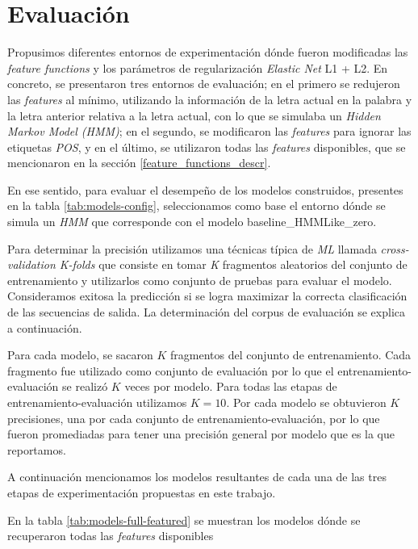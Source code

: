 \documentclass[letterpaper,12pt,oneside]{book}
\theoremstyle{definition}
\begin{document}
\section{Evaluación}

Propusimos diferentes entornos de experimentación dónde fueron modificadas las \textit{feature functions} y los parámetros de regularización \textit{Elastic Net} L1 + L2. En concreto, se presentaron tres entornos de evaluación; en el primero se redujeron las \textit{features} al mínimo, utilizando la información de la letra actual en la palabra y la letra anterior relativa a la letra actual, con lo que se simulaba un \textit{Hidden Markov Model (HMM)}; en el segundo, se modificaron las \textit{features} para ignorar las etiquetas \textit{POS}, y en el último, se utilizaron todas las \textit{features} disponibles, que se mencionaron en la sección \ref{feature_functions_descr}.

En ese sentido, para evaluar el desempeño de los modelos construidos, presentes en la tabla \ref{tab:models-config}, seleccionamos como base el entorno dónde se simula un \textit{HMM} que corresponde con el modelo \textsf{baseline\_HMMLike\_zero}. 

Para determinar la precisión utilizamos una técnicas típica de \textit{ML} llamada \textit{cross-validation K-folds} que consiste en tomar \textit{K} fragmentos aleatorios del conjunto de entrenamiento y utilizarlos como conjunto de pruebas para evaluar el modelo. Consideramos exitosa la predicción si se logra maximizar la correcta clasificación de las secuencias de salida. La determinación del corpus de evaluación se explica a continuación.

Para cada modelo, se sacaron $K$ fragmentos del conjunto de entrenamiento. Cada fragmento fue utilizado como conjunto de evaluación por lo que el entrenamiento-evaluación se realizó $K$ veces por modelo. Para todas las etapas de entrenamiento-evaluación utilizamos $K = 10$. Por cada modelo se obtuvieron $K$ precisiones, una por cada conjunto de entrenamiento-evaluación, por lo que fueron promediadas para tener una precisión general por modelo que es la que reportamos.


A continuación mencionamos los modelos resultantes de cada una de las tres etapas de experimentación propuestas en este trabajo.

En la tabla \ref{tab:models-full-featured} se muestran los modelos dónde se recuperaron todas las \textit{features} disponibles
\end{document}
